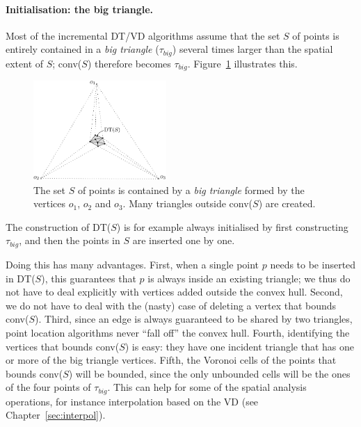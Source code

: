 \paragraph{Initialisation: the big triangle.}
\label{sec:big_tr}
Most of the incremental DT/VD algorithms assume that the set $S$ of points is entirely contained in a \emph{big triangle} ($\tau_{big}$) several times larger than the spatial extent of $S$; conv($S$) therefore becomes $\tau_{big}$. 
Figure~\ref{fig:big_tr} illustrates this.
\begin{figure}
  \centering
  \includegraphics[width=0.45\textwidth]{figs/big_tr}
  \caption[The big triangle containing all the dataset.]{The set $S$ of points is contained by a \emph{big triangle} formed by the vertices $o_1$, $o_2$ and $o_3$. Many triangles outside conv($S$) are created.} 
\label{fig:big_tr}
\end{figure}
The construction of DT($S$) is for example always initialised by first constructing $\tau_{big}$, and then the points in $S$ are inserted one by one. 

%

Doing this has many advantages. 
First, when a single point $p$ needs to be inserted in DT($S$), this guarantees that $p$ is always inside an existing triangle; we thus do not have to deal explicitly with vertices added outside the convex hull. 
Second, we do not have to deal with the (nasty) case of deleting a vertex that bounds conv($S$). 
Third, since an edge is always guaranteed to be shared by two triangles, point location algorithms never ``fall off'' the convex hull. 
Fourth, identifying the vertices that bounds conv($S$) is easy: they have one incident triangle that has one or more of the big triangle vertices.
Fifth, the Voronoi cells of the points that bounds conv($S$) will be bounded, since the only unbounded cells will be the ones of the four points of $\tau_{big}$. 
This can help for some of the spatial analysis operations, for instance interpolation based on the VD (see Chapter~\ref{sec:interpol}).

%

